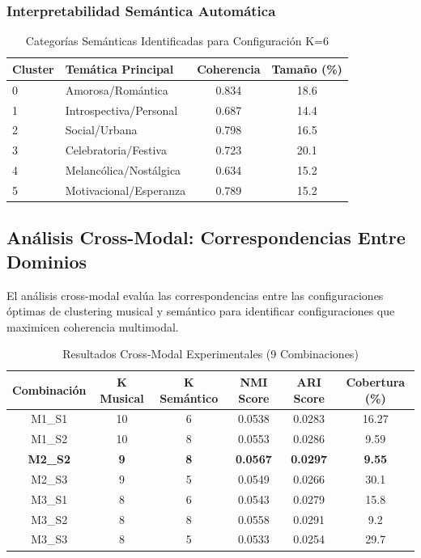 \documentclass[12pt,a4paper]{report}
\begin{document}
\subsubsection{Interpretabilidad Semántica Automática}

\begin{table}[H]
\centering
\caption{Categorías Semánticas Identificadas para Configuración K=6}
\begin{tabular}{|l|l|c|c|}
\hline
\textbf{Cluster} & \textbf{Temática Principal} & \textbf{Coherencia} & \textbf{Tamaño (\%)} \\
\hline
0 & Amorosa/Romántica & 0.834 & 18.6 \\
\hline
1 & Introspectiva/Personal & 0.687 & 14.4 \\
\hline
2 & Social/Urbana & 0.798 & 16.5 \\
\hline
3 & Celebratoria/Festiva & 0.723 & 20.1 \\
\hline
4 & Melancólica/Nostálgica & 0.634 & 15.2 \\
\hline
5 & Motivacional/Esperanza & 0.789 & 15.2 \\
\hline
\end{tabular}
\end{table}

\subsection{Análisis Cross-Modal: Correspondencias Entre Dominios}

El análisis cross-modal evalúa las correspondencias entre las configuraciones óptimas de clustering musical y semántico para identificar configuraciones que maximicen coherencia multimodal.

\begin{table}[H]
\centering
\caption{Resultados Cross-Modal Experimentales (9 Combinaciones)}
\begin{tabular}{|c|c|c|c|c|c|}
\hline
\textbf{Combinación} & \textbf{K Musical} & \textbf{K Semántico} & \textbf{NMI Score} & \textbf{ARI Score} & \textbf{Cobertura (\%)} \\
\hline
M1\_S1 & 10 & 6 & 0.0538 & 0.0283 & 16.27 \\
\hline
M1\_S2 & 10 & 8 & 0.0553 & 0.0286 & 9.59 \\
\hline
\textbf{M2\_S2} & \textbf{9} & \textbf{8} & \textbf{0.0567} & \textbf{0.0297} & \textbf{9.55} \\
\hline
M2\_S3 & 9 & 5 & 0.0549 & 0.0266 & 30.1 \\
\hline
M3\_S1 & 8 & 6 & 0.0543 & 0.0279 & 15.8 \\
\hline
M3\_S2 & 8 & 8 & 0.0558 & 0.0291 & 9.2 \\
\hline
M3\_S3 & 8 & 5 & 0.0533 & 0.0254 & 29.7 \\
\hline
\end{tabular}
\end{table}
\end{document}
